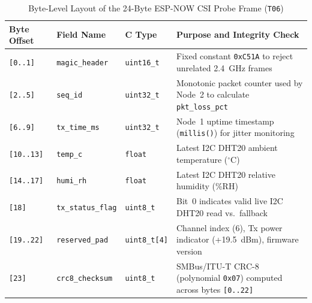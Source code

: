 \documentclass{hcmut-report}
\begin{document}
\begin{table}[H]
\centering
\caption{Byte-Level Layout of the 24-Byte ESP-NOW CSI Probe Frame (\texttt{T06})}
\label{tab:espnow_frame}
\footnotesize
\begin{tabularx}{\textwidth}{|C{1.8cm}|P{3.0cm}|C{2.0cm}|Y|}
\hline
\textbf{Byte Offset} & \textbf{Field Name} & \textbf{C Type} & \textbf{Purpose and Integrity Check} \\
\hline
\texttt{[0..1]} & \texttt{magic\_header} & \texttt{uint16\_t} & Fixed constant \texttt{0xC51A} to reject unrelated 2.4~GHz frames \\
\hline
\texttt{[2..5]} & \texttt{seq\_id} & \texttt{uint32\_t} & Monotonic packet counter used by Node~2 to calculate \texttt{pkt\_loss\_pct} \\
\hline
\texttt{[6..9]} & \texttt{tx\_time\_ms} & \texttt{uint32\_t} & Node~1 uptime timestamp (\texttt{millis()}) for jitter monitoring \\
\hline
\texttt{[10..13]} & \texttt{temp\_c} & \texttt{float} & Latest I2C DHT20 ambient temperature ($^\circ$C) \\
\hline
\texttt{[14..17]} & \texttt{humi\_rh} & \texttt{float} & Latest I2C DHT20 relative humidity (\%RH) \\
\hline
\texttt{[18]} & \texttt{tx\_status\_flag} & \texttt{uint8\_t} & Bit~0 indicates valid live I2C DHT20 read vs.\ fallback \\
\hline
\texttt{[19..22]} & \texttt{reserved\_pad} & \texttt{uint8\_t[4]} & Channel index (6), Tx power indicator (+19.5~dBm), firmware version \\
\hline
\texttt{[23]} & \texttt{crc8\_checksum} & \texttt{uint8\_t} & SMBus/ITU-T CRC-8 (polynomial \texttt{0x07}) computed across bytes \texttt{[0..22]} \\
\hline
\end{tabularx}
\end{table}
\end{document}
